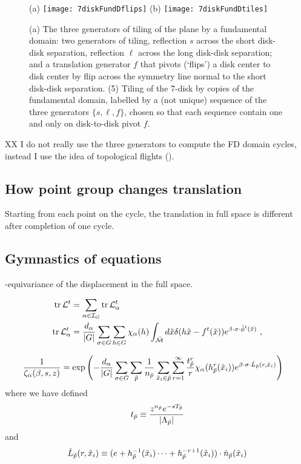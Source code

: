 \documentclass[aps,pre,preprint,groupedaddress,floatfix]{revtex4-1}
\begin{document}
\begin{figure}
\begin{center}
(a) \texttt{[image: 7diskFundDflips]}
(b) \texttt{[image: 7diskFundDtiles]}
\end{center}
\caption{\label{fig-7diskFundDflips} (a) The three generators of tiling of the plane by a fundamental domain: two generators of  tiling, reflection $s$ across the short disk-disk separation, reflection  $\ell$  across the long disk-disk separation; and a translation generator $f$ that pivots (`flips') a disk center to disk center by flip across the symmetry line normal to the short disk-disk separation. (5) Tiling of the 7-disk by copies of the fundamental domain, labelled by a (not unique) sequence of the three generators $\{s,\ell,f\}$, chosen so that each sequence contain one and only on disk-to-disk pivot $f$. }
\end{figure}
XX I do not really use the three generators to compute the FD domain cycles, instead I use the idea of topological flights (). 

\subsection{How point group changes translation}

Starting from each point on the cycle, the translation in full space is different after completion of one cycle. 



\subsection{Gymnastics of equations}

\Group-equivariance of the displacement in the full space.

\begin{align}
\mbox{\rm tr}\,{\cal L}^t &=
\sum_{\alpha \in{\cal I}_G} \mbox{\rm tr}\,{\cal L}_{\alpha}^t\nonumber\\
\mbox{\rm tr}\,{\cal L}_{\alpha}^t &=
\frac{d_\alpha}{|G|}\sum_{\sigma \in G}\sum_{h\in G}\chi_\alpha(h)
\int_{\tilde {\cal M}} d\tilde x \delta (h\tilde x - f^t(\tilde x))
e^{\beta\cdot\sigma\cdot\hat \phi^t(\tilde x)}~,
\label{e1}
\end{align}

\begin{align}
\frac{1}{\zeta_{\alpha}(\beta,s,z)} &=\exp\left(
-\frac{d_\alpha}{|G|}\sum_{\sigma\in G}\sum_{{\tilde p}}\frac{1}{n_{{\tilde p}}}
\sum_{\tilde x_{i}\in\tilde{p}}\sum_{r=1}^{\infty}
\frac{t_{{\tilde p}}^{r}}{r}\chi_{\alpha}(h_{\tilde p}^{r}(\tilde x_i))
e^{\beta\cdot\sigma\cdot\hat{L}_{{\tilde p}}(r,\tilde x_i)}
\right)
\end{align}
where we have defined
\begin{equation}
t_{{\tilde p}}\equiv \frac{z^{n_{{\tilde p}}}e^{-sT_{{\tilde p}}}}{|\Lambda_{\tilde p}|}
\end{equation}
and
\begin{equation}
\hat{L}_{{\tilde p}}(r,\tilde x_i)\equiv (e+h_{\tilde p}^{-1}(\tilde x_i)\cdots+h_{\tilde p}^{-r+1}(\tilde x_i))\cdot\hat n_{{\tilde p}}(\tilde x_i)
\end{equation}
\end{document}
